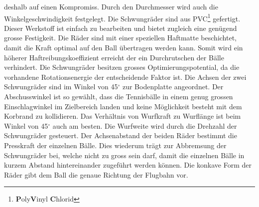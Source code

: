 deshalb auf einen Kompromiss. Durch den Durchmesser wird auch die Winkelgeschwindigkeit
festgelegt. Die Schwungräder sind aus PVC\footnote{\textbf{P}oly\textbf{V}inyl \textbf{C}hlorid}
gefertigt. Dieser Werkstoff ist einfach zu bearbeiten und bietet zugleich eine genügend grosse
Festigkeit. Die Räder sind mit einer speziellen Haftmatte beschichtet, damit die Kraft optimal auf
den Ball übertragen werden kann. Somit wird ein höherer Haftreibungskoeffizient erreicht der ein
Durchrutschen der Bälle verhindert. Die Schwungräder besitzen grosses Optimierungspotential,
da die vorhandene Rotationsenergie der entscheidende Faktor ist. Die Achsen der zwei Schwungräder
sind im Winkel von 45$^\circ$ zur Bodenplatte angeordnet. Der Abschusswinkel ist so gewählt, dass die
Tennisbälle in einem genug grossen Einschlagwinkel im Zielbereich landen und keine Möglichkeit
besteht mit dem Korbrand zu kollidieren. Das Verhältnis von Wurfkraft zu Wurflänge ist beim Winkel
von 45$^\circ$ auch am besten. Die Wurfweite wird durch die Drehzahl der Schwungräder gesteuert. Der
Achsenabstand der beiden Räder bestimmt die Presskraft der einzelnen Bälle. Dies wiederum trägt zur
Abbremsung der Schwungräder bei, welche nicht zu gross sein darf, damit die einzelnen Bälle in
kurzem Abstand hintereinander zugeführt werden können. Die konkave Form der Räder gibt dem Ball die
genaue Richtung der Flugbahn vor.
	
	
	